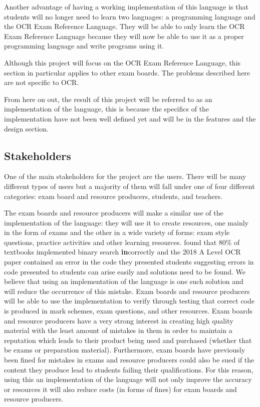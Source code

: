 \documentclass{article}
\begin{document}
Another advantage of having a working implementation of this language is that
students will no longer need to learn two languages: a programming language and
the OCR Exam Reference Language. They will be able to only learn the OCR Exam
Reference Language because they will now be able to use it as a proper
programming language and write programs using it.

Although this project will focus on the OCR Exam Reference Language, this
section in particular applies to other exam boards. The problems described here
are not specific to OCR.


From here on out, the result of this project will be referred to as an
implementation of the language, this is because the specifics of the
implementation have not been well defined yet and will be in the features and
the design section.

\subsection{Stakeholders}

One of the main stakeholders for the project are the users. There will be
many different types of users but a majority of them will fall under one of
four different categories: exam board and resource producers, students, and
teachers.

The exam boards and resource producers will make a similar use of the
implementation of the language: they will use it to create resources, one
mainly in the form of exams and the other in a wide variety of forms: exam
style questions, practice activities and other learning resources.
\Textcite{pattis88} found that 80\% of textbooks implemented binary search
\textbf{in}correctly and the 2018 A Level OCR paper contained an error in the
code they presented students suggesting errors in code presented to students
can arise easily and solutions need to be found. We believe that using an
implementation of the language is one such solution and will reduce the
occurrence of this mistake. Exam boards and resource producers will be able to
use the implementation to verify through testing that correct code is produced
in mark schemes, exam questions, and other resources. Exam boards and resource
producers have a very strong interest in creating high quality material with
the least amount of mistakes in them in order to maintain a reputation which
leads to their product being used and purchased (whether that be exams or
preparation material). Furthermore, exam boards have previously been fined for
mistakes in exams \cite{ofqual20180702} and resource producers could also be
sued if the content they produce lead to students failing their qualifications.
For this reason, using this an implementation of the language will not only
improve the accuracy or resources it will also reduce costs (in forms of fines)
for exam boards and resource producers.
\end{document}
